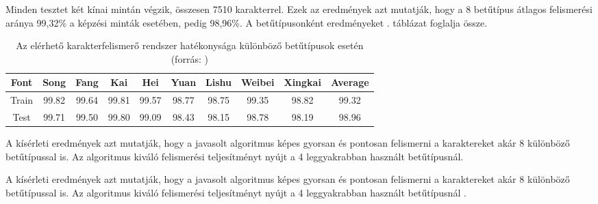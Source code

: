 Minden tesztet két kínai mintán végzik, összesen 7510 karakterrel. Ezek az eredmények azt mutatják, hogy a 8 betűtípus átlagos felismerési aránya 99,32\% a képzési minták esetében, pedig 98,96\%. A betűtípusonként eredményeket . táblázat foglalja össze.

\begin{table}
\centering
\begin{tabular}{ |c|c|c|c|c|c|c|c|c|c|}
\hline
Font & Song & Fang & Kai & Hei & Yuan & Lishu & Weibei & Xingkai & Average\\
\hline
Train & 99.82 & 99.64 & 99.81 & 99.57 & 98.77 & 98.75 & 99.35 & 98.82 & 99.32\\
\hline
Test & 99.71 & 99.50 & 99.80 & 99.09 & 98.43 & 98.15 & 98.78 & 98.19 & 98.96\\
\hline
\end{tabular}
\caption{Az elérhető karakterfelismerő rendszer hatékonysága különböző betűtípusok esetén (forrás: \cite{wu2002recognition})}
\label{tab:ccr_results}
\end{table}

A kísérleti eredmények azt mutatják, hogy a javasolt algoritmus képes gyorsan és pontosan felismerni a karaktereket akár 8 különböző betűtípussal is. Az algoritmus kiváló felismerési teljesítményt nyújt a 4 leggyakrabban használt betűtípusnál.


A kísérleti eredmények azt mutatják, hogy a javasolt algoritmus képes gyorsan és pontosan felismerni a karaktereket akár 8 különböző betűtípussal is. Az algoritmus kiváló felismerési teljesítményt nyújt a 4 leggyakrabban használt betűtípusnál \cite{wu2002recognition}.
